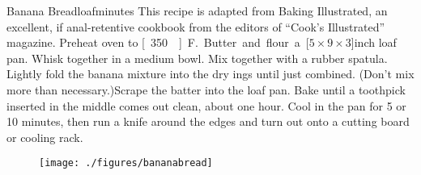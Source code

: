 \begin{recipe}{Banana Bread}{\unit[1]{loaf}}{\unit[90]{minutes}}
\freeform This recipe is adapted from Baking Illustrated, an excellent, if anal-retentive cookbook from the editors of ``Cook's Illustrated'' magazine.
\newstep Preheat oven to \unit[350\0]{F.} Butter and flour a \unit[$5\times 9\times 3$]{inch} loaf pan.
Whisk together in a medium bowl.
Mix together with a rubber spatula. Lightly fold the banana mixture into the dry ings until just combined. (Don't mix more than necessary.)Scrape the batter into the loaf pan. Bake until a toothpick inserted in the middle comes out clean, about one hour. Cool in the pan for 5 or 10 minutes, then run a knife around the edges and turn out onto a cutting board or cooling rack. 
\end{recipe}
\begin{figure}[h!]
\begin{center}
\texttt{[image: ./figures/bananabread]}
\end{center}
\end{figure}

